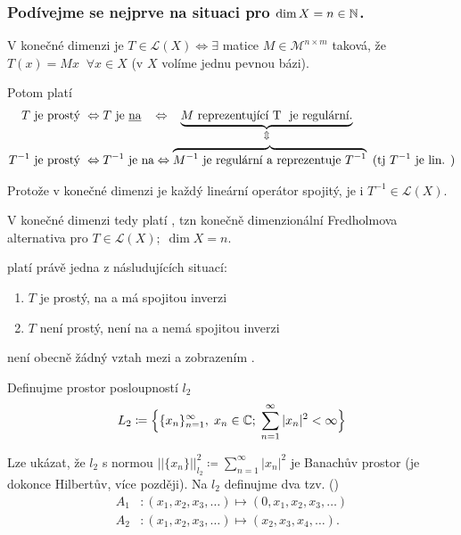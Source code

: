 \subsubsection{Podívejme se nejprve na situaci pro $\dim X=n\in \mathbb{N}$.}

V konečné dimenzi je $T\in \mathscr{L}(X)\Leftrightarrow \exists$ matice $M\in \mathcal{M}^{n\times m}$ taková, že $T(x)=Mx \;\;\forall x \in X$ (v $X$ volíme jednu pevnou bázi).

Potom platí 
$$
\begin{split}
T \text{ je prostý } &\Leftrightarrow  T \text{ je \underline{na} } \;\;\Leftrightarrow \;\;\; \underbrace{M \text{ reprezentující T \text{ je regulární.}}}_{ \Updownarrow}  \\  
T^{-1} \text{ je prostý } &\Leftrightarrow T^{-1} \text{ je na} \Leftrightarrow \overbrace{M^{-1} \text{ je regulární a reprezentuje } T^{-1} }\text{ (tj } T^{-1} \text{ je lin. )}
\end{split}
$$


Protože v konečné dimenzi je každý lineární operátor spojitý, je i $T^{-1}\in\mathscr{L}(X)$.

V konečné dimenzi tedy platí , tzn konečně dimenzionální Fredholmova alternativa pro $T\in\mathscr{L}(X);\;\dim X=n$.

platí právě jedna z násludujících situací:
\begin{enumerate}
    \item $T$ je prostý, na a má spojitou inverzi
    \item $T$ není prostý, není na a nemá spojitou inverzi
\end{enumerate}
 není obecně žádný vztah mezi  a zobrazením .

\Priklad

Definujme prostor posloupností $l_2$
$$L_2\coloneqq \Big\{ \{x_n\}_{n=1}^\infty,\; x_n\in\mathbb{C};\;\sum\limits_{n=1}^\infty|x_n|^2<\infty\Big\}$$

Lze ukázat, že $l_2$ s normou $||\{x_n\}||^2_{l_2}\coloneqq \sum_{n=1}^\infty|x_n|^2$ je Banachův prostor (je dokonce Hilbertův, více později). Na $l_2$ definujme dva tzv.  ()
\begin{equation*}
\begin{split}
  A_1&: (x_1,x_2,x_3,\dots)\mapsto (0,x_1,x_2,x_3,\dots)\\
  A_2&: (x_1,x_2,x_3,\dots)\mapsto (x_2,x_3,x_4,\dots).
\end{split}
\end{equation*}

